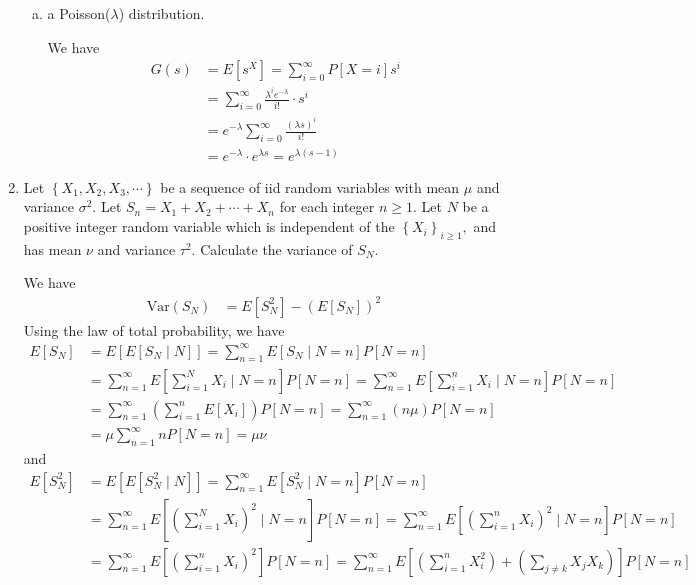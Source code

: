 \documentclass{article}
\newcommand{\var}{\mathrm{Var}}
\begin{document}
\begin{enumerate}
\begin{enumerate}[(a)]
			\item a Poisson($\lambda$) distribution.
				\begin{soln}
					We have
					\begin{align*}
						G(s) &= E[s^X] = \sum_{i=0}^{\infty} P[X=i] s^i \\
						&= \sum_{i=0}^{\infty} \frac{\lambda^i e^{-\lambda}}{i!}\cdot s^i \\
						&= e^{-\lambda}\sum_{i=0}^{\infty} \frac{(\lambda s)^i}{i!} \\
						&= e^{-\lambda} \cdot e^{\lambda s} = e^{\lambda(s-1)}
					\end{align*}
				\end{soln}
				
		\end{enumerate}

	\item Let $\left\{ X_1, X_2, X_3, \cdots \right\}$ be a sequence of iid random variables with mean $\mu$ and variance $\sigma^2.$ Let $S_n=X_1+X_2+\cdots+X_n$ for each integer $n\ge1.$ Let $N$ be a positive integer random variable which is independent of the $\left\{ X_i \right\}_{i\ge1},$ and has mean $\nu$ and variance $\tau^2.$ Calculate the variance of $S_N.$
		\begin{soln}
			We have
			\begin{align*}
				\var(S_N) &= E[S_N^2]-(E[S_N])^2
			\end{align*}
			Using the law of total probability, we have
			\begin{align*}
				E[S_N] &= E\left[ E[S_N\mid N] \right] = \sum_{n=1}^{\infty}E[S_N\mid N=n]P[N=n] \\
				&= \sum_{n=1}^{\infty}E\left[ \sum_{i=1}^{N} X_i \mid N=n\right]P[N=n] = \sum_{n=1}^{\infty}E\left[ \sum_{i=1}^{n} X_i\mid N=n \right] P[N=n] \\
				&= \sum_{n=1}^{\infty}\left(\sum_{i=1}^{n} E[X_i]\right) P[N=n] = \sum_{n=1}^{\infty} (n\mu)P[N=n] \\
				&= \mu \sum_{n=1}^{\infty}nP[N=n] = \mu\nu
			\end{align*}
			and 
			\begin{align*}
				E[S_N^2] &= E\left[ E[S_N^2\mid N] \right] = \sum_{n=1}^{\infty} E[S_N^2\mid N=n] P[N=n] \\
				&= \sum_{n=1}^{\infty}E\left[ \left( \sum_{i=1}^{N} X_i \right)^2\mid N=n \right]P[N=n] = \sum_{n=1}^{\infty}E\left[ \left( \sum_{i=1}^{n} X_i \right)^2\mid N=n \right]P[N=n] \\
				&= \sum_{n=1}^{\infty} E\left[ \left( \sum_{i=1}^{n} X_i \right)^2 \right] P[N=n] = \sum_{n=1}^{\infty} E\left[ \left( \sum_{i=1}^{n} X_i^2 \right) + \left( \sum_{j\neq k}^{} X_j X_k \right) \right] P[N=n] \\

\end{align*}
\end{soln}
\end{enumerate}
\end{document}
